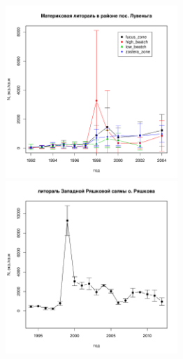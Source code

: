 \documentclass[12pt, a4paper]{disser}
\begin{document}
\begin{figure}[h]


	\begin{minipage}[b]{.46\linewidth}
	\begin{center}
		\includegraphics[width=65mm]{../White_Sea//Luvenga_II_razrez/N_dynamic.pdf}
	\end{center}
	\end{minipage}
%
	\hfil %
%
	\begin{minipage}[b]{.46\linewidth}
	\begin{center}
		\includegraphics[width=65mm]{../White_Sea/Ryashkov_ZRS/N_dynamic.pdf}
	\end{center}
	\end{minipage}



\end{figure}
\end{document}
